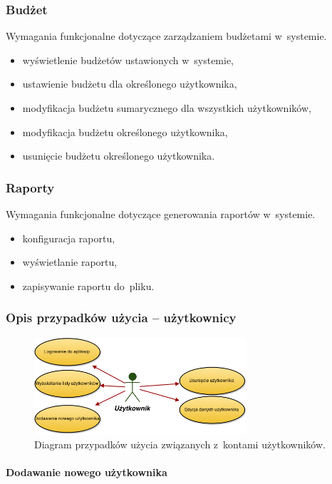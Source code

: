 \subsubsection{Budżet}
Wymagania funkcjonalne dotyczące zarządzaniem budżetami w~systemie.
\begin{itemize}
  \item wyświetlenie budżetów ustawionych w~systemie,
  \item ustawienie budżetu dla określonego użytkownika,
  \item modyfikacja budżetu sumarycznego dla wszystkich użytkowników,
  \item modyfikacja budżetu określonego użytkownika,
  \item usunięcie budżetu określonego użytkownika.
\end{itemize}

\subsubsection{Raporty}
Wymagania funkcjonalne dotyczące generowania raportów w~systemie.
\begin{itemize}
  \item konfiguracja raportu,
  \item wyświetlanie raportu,
  \item zapisywanie raportu do~pliku.
\end{itemize}

\subsubsection{Opis przypadków użycia -- użytkownicy}

\begin{figure}[H]
  \centering
  \includegraphics[width=0.7\textwidth]{images/przypadki_uzytkownik.png}
  \caption{Diagram przypadków użycia związanych z~kontami użytkowników.}
\end{figure}

\paragraph{Dodawanie nowego użytkownika\newline}
\label{par:register}

